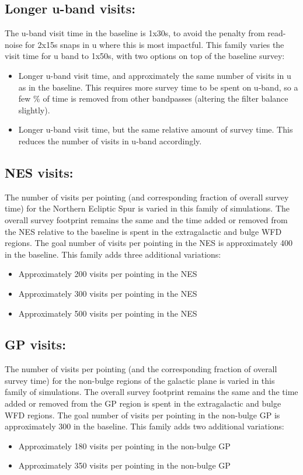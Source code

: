 \subsection{Longer u-band visits:}
The u-band visit time in the baseline is 1x30s, to avoid the penalty from read-noise for 2x15s snaps in u where this is most impactful. This family varies the visit time for u band to 1x50s, with two options on top of the baseline survey: 
\begin{itemize}
\item Longer u-band visit time, and approximately the same number of visits in u as in the baseline. This requires more survey time to be spent on u-band, so a few \% of time is removed from other bandpasses (altering the filter balance slightly). 
\item Longer u-band visit time, but the same relative amount of survey time. This reduces the number of visits in u-band accordingly.
\end{itemize} 

\subsection{NES visits:}
The number of visits per pointing (and corresponding fraction of overall survey time) for the Northern Ecliptic Spur is varied in this family of simulations. The overall survey footprint remains the same and the time added or removed from the NES relative to the baseline is spent in the extragalactic and bulge WFD regions. The goal number of visits per pointing in the NES is approximately 400 in the baseline. This family adds three additional variations:
\begin{itemize}
\item Approximately 200 visits per pointing in the NES
\item Approximately 300 visits per pointing in the NES
\item Approximately 500 visits per pointing in the NES
\end{itemize}

\subsection{GP visits: }
The number of visits per pointing (and the corresponding fraction of overall survey time) for the non-bulge regions of the galactic plane is varied in this family of simulations. The overall survey footprint remains the same and the time added or removed from the GP region is spent in the extragalactic and bulge WFD regions. The goal number of visits per pointing in the non-bulge GP is approximately 300 in the baseline. This family adds two additional variations: 
\begin{itemize}
\item Approximately 180 visits per pointing in the non-bulge GP
\item Approximately 350 visits per pointing in the non-bulge GP
\end{itemize}

